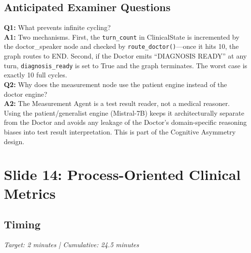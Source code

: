 \subsection*{Anticipated Examiner Questions}
\begin{qabox}
\textbf{Q1:} What prevents infinite cycling? \\
\textbf{A1:} Two mechanisms. First, the \texttt{turn\_count} in ClinicalState is incremented by the doctor\_speaker node and checked by \texttt{route\_doctor()}---once it hits 10, the graph routes to END. Second, if the Doctor emits ``DIAGNOSIS READY'' at any turn, \texttt{diagnosis\_ready} is set to True and the graph terminates. The worst case is exactly 10 full cycles. \\[6pt]
\textbf{Q2:} Why does the measurement node use the patient engine instead of the doctor engine? \\
\textbf{A2:} The Measurement Agent is a test result reader, not a medical reasoner. Using the patient/generalist engine (Mistral-7B) keeps it architecturally separate from the Doctor and avoids any leakage of the Doctor's domain-specific reasoning biases into test result interpretation. This is part of the Cognitive Asymmetry design.
\end{qabox}



\section{Slide 14: Process-Oriented Clinical Metrics}

\subsection*{Timing}
\textit{Target: 2 minutes | Cumulative: 24.5 minutes}

